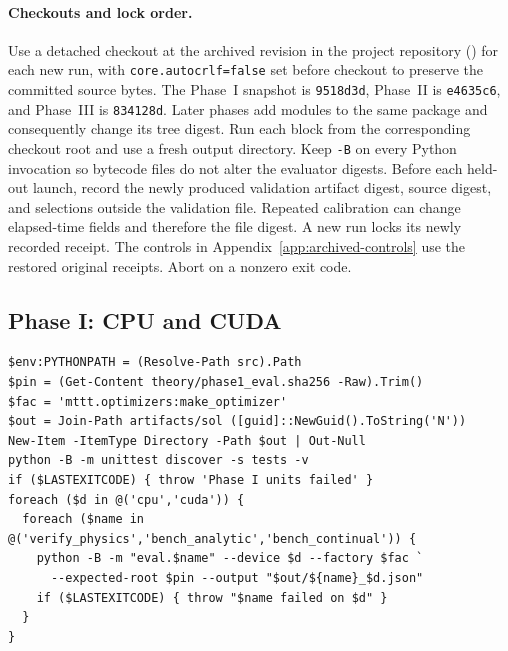 \paragraph{Checkouts and lock order.}
Use a detached checkout at the archived revision in the project repository (\RepoLink{}) for each new run, with \texttt{core.autocrlf=false} set before checkout to preserve the committed source bytes. The Phase~I snapshot is \texttt{9518d3d}, Phase~II is \texttt{e4635c6}, and Phase~III is \texttt{834128d}. Later phases add modules to the same package and consequently change its tree digest. Run each block from the corresponding checkout root and use a fresh output directory. Keep \texttt{-B} on every Python invocation so bytecode files do not alter the evaluator digests. Before each held-out launch, record the newly produced validation artifact digest, source digest, and selections outside the validation file. Repeated calibration can change elapsed-time fields and therefore the file digest. A new run locks its newly recorded receipt. The controls in Appendix~\ref{app:archived-controls} use the restored original receipts. Abort on a nonzero exit code.

\subsection{Phase I: CPU and CUDA}
\begin{commandblock}
\begin{verbatim}
$env:PYTHONPATH = (Resolve-Path src).Path
$pin = (Get-Content theory/phase1_eval.sha256 -Raw).Trim()
$fac = 'mttt.optimizers:make_optimizer'
$out = Join-Path artifacts/sol ([guid]::NewGuid().ToString('N'))
New-Item -ItemType Directory -Path $out | Out-Null
python -B -m unittest discover -s tests -v
if ($LASTEXITCODE) { throw 'Phase I units failed' }
foreach ($d in @('cpu','cuda')) {
  foreach ($name in @('verify_physics','bench_analytic','bench_continual')) {
    python -B -m "eval.$name" --device $d --factory $fac `
      --expected-root $pin --output "$out/${name}_$d.json"
    if ($LASTEXITCODE) { throw "$name failed on $d" }
  }
}
\end{verbatim}
\end{commandblock}

